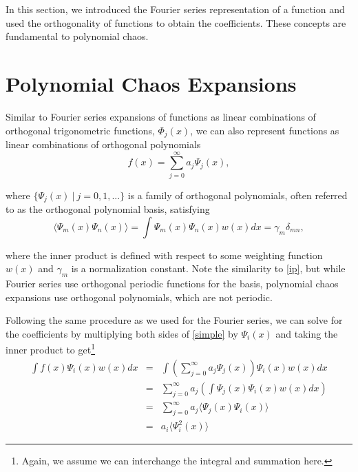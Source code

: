 \documentclass[11pt]{article}
\numberwithin{equation}{section}
\begin{document}
In this section, we introduced the Fourier series representation of a function and used the orthogonality of functions to obtain the coefficients. These concepts are fundamental to polynomial chaos.









\section{Polynomial Chaos Expansions}

Similar to Fourier series expansions of functions as linear combinations of orthogonal trigonometric functions, $\Phi_j(x)$, we can also represent functions as linear combinations of orthogonal polynomials
\begin{equation}
f(x) = \sum_{j=0}^{\infty}  a_j \Psi_j(x), \label{simple}
\end{equation}

where $\{ \Psi_j(x) \ | \ j = 0, 1, ... \}$ is a family of orthogonal polynomials, often referred to as the orthogonal polynomial basis, satisfying
\begin{equation}
\langle \Psi_m(x) \Psi_n(x) \rangle = \int \Psi_m(x) \Psi_n(x) w(x) dx = \gamma_m \delta_{mn}, \label{orth_poly}
\end{equation}

where the inner product is defined with respect to some weighting function $w(x)$ and $\gamma_m$ is a normalization constant. Note the similarity to \eqref{ip}, but while Fourier series use orthogonal periodic functions for the basis, polynomial chaos expansions use orthogonal polynomials, which are not periodic.

\qquad Following the same procedure as we used for the Fourier series, we can solve for the coefficients by multiplying both sides of \eqref{simple} by $\Psi_i(x)$ and taking the inner product to get\footnote{Again, we assume we can interchange the integral and summation here.} 
\begin{eqnarray*}
\int f(x) \Psi_i(x) w(x) dx & = & \int \left( \sum_{j = 0}^{\infty} a_j \Psi_j(x) \right) \Psi_i(x) w(x) dx \\
& = & \sum_{j = 0}^{\infty}  a_j  \left( \int \Psi_j(x) \Psi_i(x) w(x) dx \right) \\
& = & \sum_{j = 0}^{\infty}  a_j  \langle \Psi_j(x) \Psi_i(x) \rangle \\
& = & a_i  \langle \Psi_i^2(x) \rangle
\end{eqnarray*}
\end{document}
